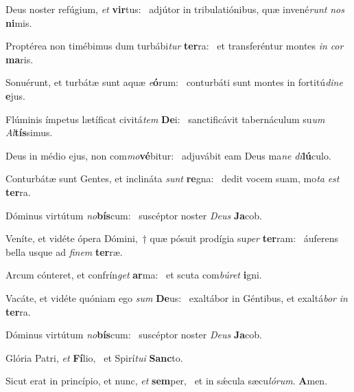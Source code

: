 \item Deus noster refúgium, \textit{et} \textbf{vir}tus:~\psstar{} adjútor in tribulatiónibus, quæ invené\textit{runt} \textit{nos} \textbf{ni}mis.
\item Proptérea non timébimus dum turbábi\textit{tur} \textbf{ter}ra:~\psstar{} et transferéntur montes \textit{in} \textit{cor} \textbf{ma}ris.
\item Sonuérunt, et turbátæ sunt aquæ \textit{e}\textbf{ó}rum:~\psstar{} conturbáti sunt montes in fortitú\textit{dine} \textbf{e}jus.
\item Flúminis ímpetus lætíficat civitá\textit{tem} \textbf{De}i:~\psstar{} sanctificávit tabernáculum su\textit{um} \textit{Al}\textbf{tís}simus.
\item Deus in médio ejus, non com\textit{mo}\textbf{vé}bitur:~\psstar{} adjuvábit eam Deus ma\textit{ne} \textit{di}\textbf{lú}culo.
\item Conturbátæ sunt Gentes, et inclináta \textit{sunt} \textbf{re}gna:~\psstar{} dedit vocem suam, mo\textit{ta} \textit{est} \textbf{ter}ra.
\item Dóminus virtútum \textit{no}\textbf{bís}\-cum:~\psstar{} suscéptor noster \textit{Deus} \textbf{Ja}cob.
\item Veníte, et vidéte ópera Dómini,~† quæ pósuit prodígia su\textit{per} \textbf{ter}ram:~\psstar{} áuferens bella usque ad \textit{finem} \textbf{ter}ræ.
\item Arcum cónteret, et confrín\textit{get} \textbf{ar}ma:~\psstar{} et scuta com\textit{búret} \textbf{i}gni.
\item Vacáte, et vidéte quóniam ego \textit{sum} \textbf{De}us:~\psstar{} exaltábor in Géntibus, et exaltá\textit{bor} \textit{in} \textbf{ter}ra.
\item Dóminus virtútum \textit{no}\textbf{bís}\-cum:~\psstar{} suscéptor noster \textit{Deus} \textbf{Ja}cob.
\item Glória Patri, \textit{et} \textbf{Fí}lio,~\psstar{} et Spirí\textit{tui} \textbf{Sanc}to.
\item Sicut erat in princípio, et nunc, \textit{et} \textbf{sem}per,~\psstar{} et in sǽcula sæcu\textit{lórum}. \textbf{A}men.